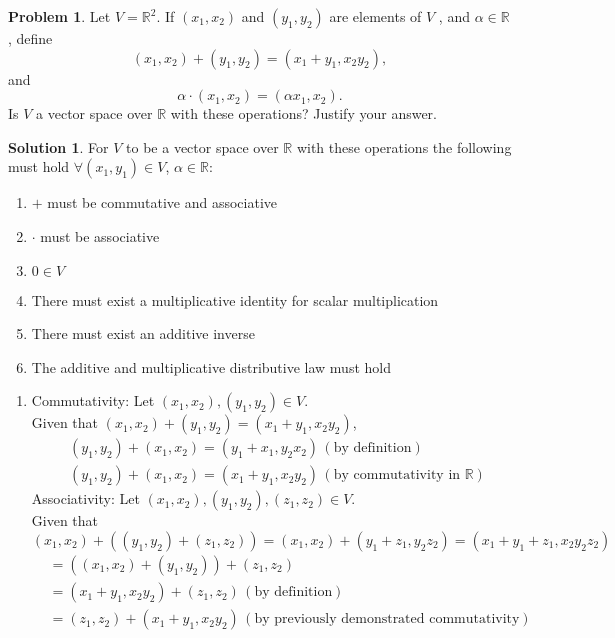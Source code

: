 \documentclass[10pt]{article}
\theoremstyle{definition}
\newtheorem{problem}{Problem}
\newtheorem{soln}{Solution}
\begin{document}
\begin{problem}
Let $V=\mathbb{R}^2$. If $(x_1, x_2)$ and $(y_1, y_2)$ are elements of $V$ , and $\alpha\in\mathbb{R}$, define
$$(x_1, x_2) + (y_1, y_2) = (x_1 + y_1, x_2y_2),$$ and $$\alpha\cdot(x_1, x_2) = (\alpha x_1, x_2).$$
Is $V$ a vector space over $\mathbb{R}$ with these operations? Justify your answer.
\end{problem}
\begin{soln} For $V$ to be a vector space over $\mathbb{R}$ with these operations the following must hold $\forall(x_1,y_1)\in V$, $\alpha\in\mathbb{R}$:
  \begin{enumerate}[label=(\roman*)]
    \item $+$ must be commutative and associative
    \item $\cdot$ must be associative
    \item $0\in V$
    \item There must exist a multiplicative identity for scalar multiplication
    \item There must exist an additive inverse
    \item The additive and multiplicative distributive law must hold
  \end{enumerate}
  \begin{enumerate}[label=(\roman*)]
    \item Commutativity: Let $(x_1, x_2), (y_1, y_2)\in V$. \\
          Given that $(x_1, x_2) + (y_1, y_2) = (x_1 + y_1, x_2y_2)$,
          \begin{align*}
             & (y_1, y_2) + (x_1, x_2) = (y_1 + x_1, y_2x_2) \, (\text{by definition})                   \\
             & (y_1, y_2) + (x_1, x_2) = (x_1 + y_1, x_2y_2) \, (\text{by commutativity in } \mathbb{R})
          \end{align*}
          Associativity: Let $(x_1, x_2), (y_1, y_2), (z_1, z_2)\in V$. \\
          Given that $(x_1, x_2) + ((y_1, y_2) + (z_1, z_2)) = (x_1, x_2) + (y_1 + z_1, y_2z_2) =(x_1 + y_1 + z_1, x_2y_2z_2)$
          \begin{align*}
             & =((x_1, x_2) + (y_1, y_2)) + (z_1, z_2)                                                \\
             & =(x_1 + y_1, x_2y_2) + (z_1, z_2) \, (\text{by definition})                            \\
             & =(z_1, z_2) + (x_1 + y_1, x_2y_2) \, (\text{by previously demonstrated commutativity}) \\

\end{align*}
\end{enumerate}
\end{soln}
\end{document}
